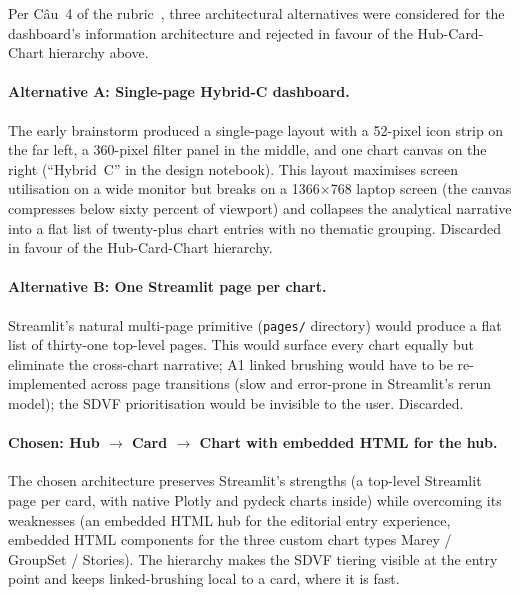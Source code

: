 Per Câu~4 of the rubric~\cite{rubric}, three architectural
alternatives were considered for the dashboard's information
architecture and rejected in favour of the Hub-Card-Chart
hierarchy above.

\paragraph{Alternative A: Single-page Hybrid-C dashboard.}
The early brainstorm produced a single-page layout with a
52-pixel icon strip on the far left, a 360-pixel filter panel
in the middle, and one chart canvas on the right (``Hybrid~C''
in the design notebook). This layout maximises screen utilisation
on a wide monitor but breaks on a 1366$\times$768 laptop screen
(the canvas compresses below sixty percent of viewport) and
collapses the analytical narrative into a flat list of
twenty-plus chart entries with no thematic grouping. Discarded
in favour of the Hub-Card-Chart hierarchy.

\paragraph{Alternative B: One Streamlit page per chart.}
Streamlit's natural multi-page primitive
(\texttt{pages/} directory) would produce a flat list of
thirty-one top-level pages. This would surface every chart
equally but eliminate the cross-chart narrative; A1 linked
brushing would have to be re-implemented across page transitions
(slow and error-prone in Streamlit's rerun model); the SDVF
prioritisation would be invisible to the user. Discarded.

\paragraph{Chosen: Hub $\rightarrow$ Card $\rightarrow$ Chart with
embedded HTML for the hub.}
The chosen architecture preserves Streamlit's strengths (a
top-level Streamlit page per card, with native Plotly and pydeck
charts inside) while overcoming its weaknesses (an embedded HTML
hub for the editorial entry experience, embedded HTML components
for the three custom chart types Marey / GroupSet / Stories). The
hierarchy makes the SDVF tiering visible at the entry point and
keeps linked-brushing local to a card, where it is fast.
